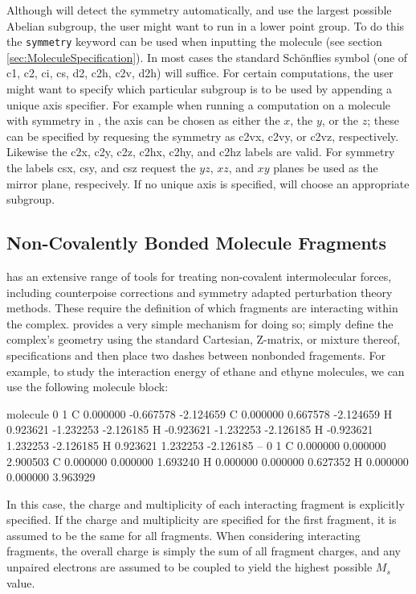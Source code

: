 Although \PSIfour will detect the symmetry automatically, and use the largest
possible Abelian subgroup, the user might want to run in a lower point group.
To do this the {\tt symmetry} keyword can be used when inputting the molecule
(see section \ref{sec:MoleculeSpecification}).  In most cases the standard
Sch\"onflies symbol (one of c1, c2, ci, cs, d2, c2h, c2v, d2h) will suffice.
For certain computations, the user might want to specify which particular
subgroup is to be used by appending a unique axis specifier.  For example when
running a computation on a molecule with  symmetry in , the
 axis can be chosen as either the $x$, the $y$, or the $z$; these can
be specified by requesing the symmetry as c2vx, c2vy, or c2vz, respectively.
Likewise the c2x, c2y, c2z, c2hx, c2hy, and c2hz labels are valid.  For
 symmetry the labels csx, csy, and csz request the $yz$, $xz$, and
$xy$ planes be used as the mirror plane, respecively.  If no unique axis is
specified, \PSIfour will choose an appropriate subgroup.
 
\subsection{Non-Covalently Bonded Molecule Fragments}

\PSIfour has an extensive range of tools for treating non-covalent
intermolecular forces, including counterpoise corrections and symmetry adapted
perturbation theory methods. These require the definition of which fragments
are interacting within the complex. \PSIfour provides a very simple mechanism
for doing so; simply define the complex's geometry using the standard
Cartesian, Z-matrix, or mixture thereof, specifications and then place two
dashes between nonbonded fragements. For example, to study the interaction
energy of ethane and ethyne molecules, we can use the following molecule
block:
\begin{Snippet}
molecule{
  0 1
  C  0.000000 -0.667578  -2.124659
  C  0.000000  0.667578  -2.124659
  H  0.923621 -1.232253  -2.126185
  H -0.923621 -1.232253  -2.126185
  H -0.923621  1.232253  -2.126185
  H  0.923621  1.232253  -2.126185
  --
  0 1
  C 0.000000 0.000000 2.900503
  C 0.000000 0.000000 1.693240 
  H 0.000000 0.000000 0.627352
  H 0.000000 0.000000 3.963929
}
\end{Snippet}
In this case, the charge and multiplicity of each interacting fragment is
explicitly specified. If the charge and multiplicity are specified for the
first fragment, it is assumed to be the same for all fragments. When
considering interacting fragments, the overall charge is simply the sum of all
fragment charges, and any unpaired electrons are assumed to be coupled to
yield the highest possible $M_s$ value.

